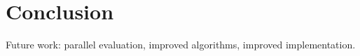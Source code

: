 \section{Conclusion}
Future work: parallel evaluation, improved algorithms, improved implementation.